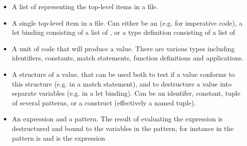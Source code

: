 \begin{itemize}
    \item {} A list of  representing the top-level items in a file.
    \item {} A single top-level item in a file. Can either be an  (e.g. for imperative code), a let binding consisting of a list of , or a type definition consisting of a list of 
    \item {} A unit of code that will produce a value. There are various types including identifiers, constants, match statements, function definitions and applications.
    \item {} A structure of a value, that can be used both to test if a value conforms to this structure (e.g. in a match statement), and to destructure a value into separate variables (e.g. in a let binding). Can be an identifer, constant, tuple of several patterns, or a construct (effectively a named tuple).
    \item {} An expression and a pattern. The result of evaluating the expression is destructured and bound to the variables in the pattern, for instance in  the pattern is  and  is the expression
\end{itemize}





